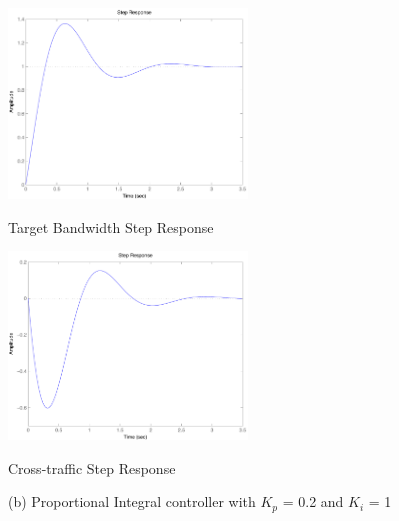 \documentclass{article}
\begin{document}
\begin{figure}[thbp]
\begin{center}
\begin{minipage}{0.4\textwidth} 
   \includegraphics[width=2.5in]{plots/trans/PI_step_B_02_1.pdf} 
\centerline{Target Bandwidth Step Response}
\end{minipage}
\hspace{1.2cm}
\begin{minipage}{0.4\textwidth} 
   \includegraphics[width=2.5in]{plots/trans/PI_step_x_02_1.pdf} 
\centerline{Cross-traffic Step Response}
\end{minipage}
\centerline{(b) Proportional Integral controller with $K_p$ = 0.2 and $K_i$ = 1}\\


\end{center}
\end{figure}
\end{document}
